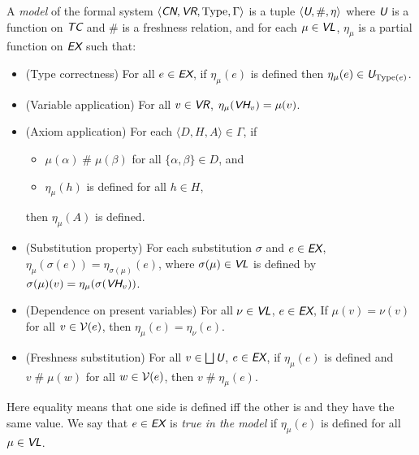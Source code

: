 \documentclass[runningheads,a4paper]{llncs}
\newcommand{\cn}{\textit{\textsf{CN}}} %
\newcommand{\vr}{\textit{\textsf{VR}}} %
\newcommand{\ex}{\textit{\textsf{EX}}} %
\newcommand{\vh}{\textit{\textsf{VH}}} %
\newcommand{\tc}{\textit{\textsf{TC}}} %
\newcommand{\vl}{\textit{\textsf{VL}}} %
\newcommand{\uv}{\textit{\textsf{U}}} %
\newcommand{\ang}[1]{\langle#1\rangle}
\newcommand{\type}{{\rm Type}}
\newcommand{\fresh}{\mathbin{\#}}
\newcommand{\ab}{\allowbreak}
\begin{document}
\begin{definition}\label{def:model}
A {\em model} of the formal system $\ang{\cn,\vr,\type,\Gamma}$ is a tuple $\ang{\uv,\fresh,\ab\eta}$ where $\uv$ is a function on $\tc$ and $\fresh$ is a freshness relation, and for each $\mu\in\vl$, $\eta_\mu$ is a partial function on $\ex$ such that:
\begin{itemize}
  \item (Type correctness) For all $e\in\ex$, if $\eta_\mu(e)$ is defined then $\eta_\mu(e)\in\uv_{\type(e)}$.
  \item (Variable application) For all $v\in\vr$, $\eta_\mu(\vh_v)=\mu(v)$.
  \item (Axiom application) For each $\ang{D,H,A}\in\Gamma$, if
  \begin{itemize}
    \item $\mu(\alpha)\fresh\mu(\beta)$ for all $\{\alpha,\beta\}\in D$, and
    \item $\eta_\mu(h)$ is defined for all $h\in H$,
  \end{itemize}
  then $\eta_\mu(A)$ is defined.
  \item (Substitution property) For each substitution $\sigma$ and $e\in\ex$, $\eta_\mu(\sigma(e))=\eta_{\sigma(\mu)}(e)$, where $\sigma(\mu)\in\vl$ is defined by $\sigma(\mu)(v)=\eta_\mu(\sigma(\vh_v))$.
  \item (Dependence on present variables) For all $\nu\in\vl$, $e\in\ex$, If $\mu(v)=\nu(v)$ for all $v\in{\cal V}(e)$, then $\eta_\mu(e)=\eta_\nu(e)$.
  \item (Freshness substitution) For all $v\in\bigsqcup\uv$,  $e\in\ex$, if $\eta_\mu(e)$ is defined and $v\fresh\mu(w)$ for all $w\in{\cal V}(e)$, then $v\fresh\eta_\mu(e)$.
\end{itemize}

Here equality means that one side is defined iff the other is and they have the same value. We say that $e\in\ex$ is {\em true in the model} if $\eta_\mu(e)$ is defined for all $\mu\in\vl$.
\end{definition}
\end{document}
